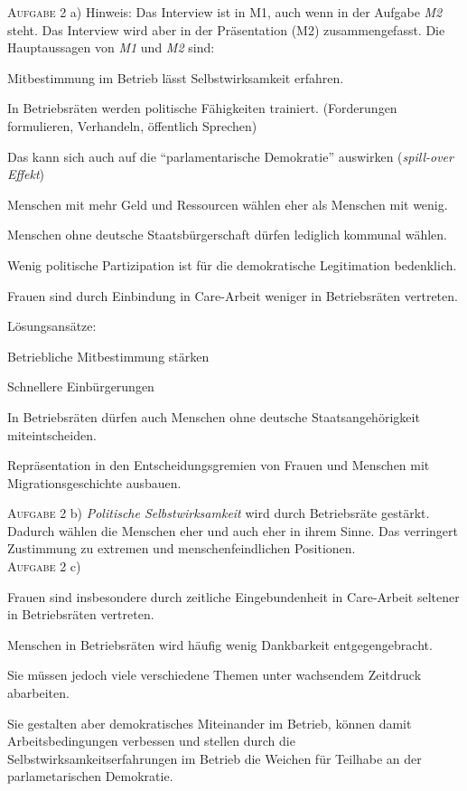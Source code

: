 \textsc{Aufgabe 2} a) \quad
Hinweis: Das Interview ist in M1, auch wenn in der Aufgabe \emph{M2} steht. 
Das Interview wird aber in der Präsentation (M2) zusammengefasst. Die Hauptaussagen von \emph{M1} und \emph{M2} sind: 
\begin{myitemize}
    \item Mitbestimmung im Betrieb lässt Selbstwirksamkeit erfahren.
    \item In Betriebsräten werden politische Fähigkeiten trainiert. (Forderungen formulieren, Verhandeln, öffentlich Sprechen)
    \item Das kann sich auch auf die \enquote{parlamentarische Demokratie} auswirken (\emph{spill-over Effekt})
    \item Menschen mit mehr Geld und Ressourcen wählen eher als Menschen mit wenig.
    \item Menschen ohne deutsche Staatsbürgerschaft dürfen lediglich kommunal wählen. %
    \item Wenig politische Partizipation ist für die demokratische Legitimation bedenklich. 
    \item Frauen sind durch Einbindung in Care-Arbeit weniger in Betriebsräten vertreten. 
    \item Lösungsansätze: 
    \begin{myitemize}
        \item Betriebliche Mitbestimmung stärken
        \item Schnellere Einbürgerungen 
        \item In Betriebsräten dürfen auch Menschen ohne deutsche Staatsangehörigkeit miteintscheiden. 
        \item Repräsentation in den Entscheidungsgremien von Frauen und Menschen mit Migrationsgeschichte ausbauen.
    \end{myitemize} 
\end{myitemize}



\textsc{Aufgabe 2} b) \quad
\emph{Politische Selbstwirksamkeit} wird durch Betriebsräte gestärkt. Dadurch wählen die Menschen eher und auch eher in ihrem Sinne. 
Das verringert Zustimmung zu extremen und menschenfeindlichen Positionen. 
\\

\textsc{Aufgabe 2} c) \quad
\begin{myitemize}
    \item Frauen sind insbesondere durch zeitliche Eingebundenheit in Care-Arbeit seltener in Betriebsräten vertreten.
    \item Menschen in Betriebsräten wird häufig wenig Dankbarkeit entgegengebracht.
    \item Sie müssen jedoch viele verschiedene Themen unter wachsendem Zeitdruck abarbeiten. 
    \item Sie gestalten aber demokratisches Miteinander im Betrieb, können damit Arbeitsbedingungen verbessen und stellen durch die Selbstwirksamkeitserfahrungen im Betrieb die Weichen für Teilhabe an der parlametarischen Demokratie. 
\end{myitemize} 


